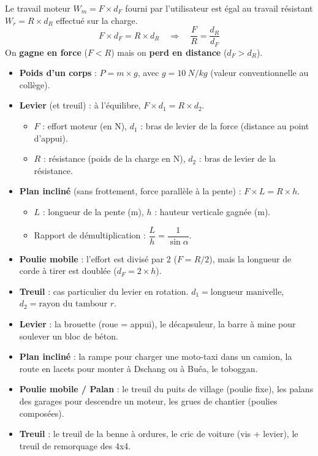 \documentclass[11pt]{article}
\begin{document}
\begin{propriete}
Le travail moteur $W_m = F \times d_F$ fourni par l'utilisateur est égal au travail résistant $W_r = R \times d_R$ effectué sur la charge.
\[ F \times d_F = R \times d_R \quad \Longrightarrow \quad \frac{F}{R} = \frac{d_R}{d_F} \]
On \textbf{gagne en force} ($F < R$) mais on \textbf{perd en distance} ($d_F > d_R$).
\end{propriete}

\begin{aretenir}
\begin{itemize}
\item \textbf{Poids d'un corps} : $P = m \times g$, avec $g = \SI{10}{N/kg}$ (valeur conventionnelle au collège).
\item \textbf{Levier} (et treuil) : à l'équilibre, $F \times d_1 = R \times d_2$.
  \begin{itemize}
  \item $F$ : effort moteur (en N), $d_1$ : bras de levier de la force (distance au point d'appui).
  \item $R$ : résistance (poids de la charge en N), $d_2$ : bras de levier de la résistance.
  \end{itemize}
\item \textbf{Plan incliné} (sans frottement, force parallèle à la pente) : $F \times L = R \times h$.
  \begin{itemize}
  \item $L$ : longueur de la pente (m), $h$ : hauteur verticale gagnée (m).
  \item Rapport de démultiplication : $\dfrac{L}{h} = \dfrac{1}{\sin\alpha}$.
  \end{itemize}
\item \textbf{Poulie mobile} : l'effort est divisé par 2 ($F = R/2$), mais la longueur de corde à tirer est doublée ($d_F = 2 \times h$).
\item \textbf{Treuil} : cas particulier du levier en rotation. $d_1 = \text{longueur manivelle}$, $d_2 = \text{rayon du tambour } r$.
\end{itemize}
\end{aretenir}

\begin{savaistu}
\begin{itemize}
\item \textbf{Levier} : la brouette (roue = appui), le décapsuleur, la barre à mine pour soulever un bloc de béton.
\item \textbf{Plan incliné} : la rampe pour charger une moto-taxi dans un camion, la route en lacets pour monter à Dschang ou à Buéa, le toboggan.
\item \textbf{Poulie mobile / Palan} : le treuil du puits de village (poulie fixe), les palans des garages pour descendre un moteur, les grues de chantier (poulies composées).
\item \textbf{Treuil} : le treuil de la benne à ordures, le cric de voiture (vis + levier), le treuil de remorquage des 4x4.
\end{itemize}
\end{savaistu}
\end{document}

